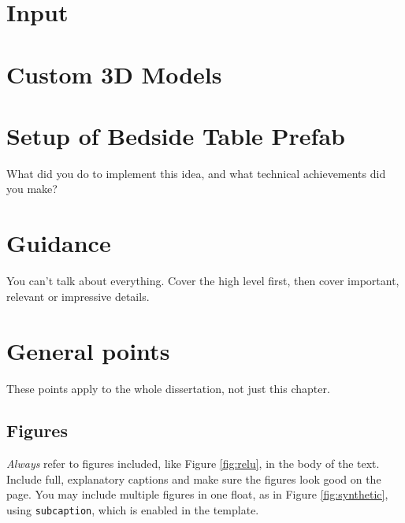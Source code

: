 \documentclass{l4proj}
\begin{document}
\section{Input}

\section{Custom 3D Models}

\section{Setup of Bedside Table Prefab}

What did you do to implement this idea, and what technical achievements did you make?
\section{Guidance}
You can't talk about everything. Cover the high level first, then cover important, relevant or impressive details.



\section{General points}

These points apply to the whole dissertation, not just this chapter.



\subsection{Figures}
\emph{Always} refer to figures included, like Figure \ref{fig:relu}, in the body of the text. Include full, explanatory captions and make sure the figures look good on the page.
You may include multiple figures in one float, as in Figure \ref{fig:synthetic}, using \texttt{subcaption}, which is enabled in the template.
\end{document}
